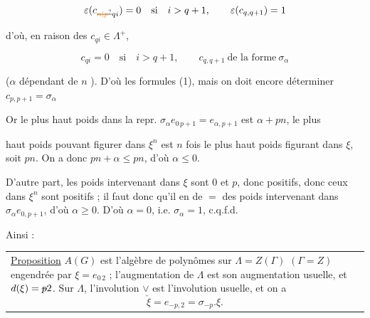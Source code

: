 \[ \varepsilon(c_{\deleted{\unsure{n|p}}qi})=0\quad\text{si}\quad i>q+1,\qquad \varepsilon(c_{q,q+1})=1 \]

d'où, en raison des $c_{qi}\in\Lambda^+$,

\[ c_{qi}=0\quad\text{si}\quad i>q+1,\qquad c_{q,q+1}\ \text{de la forme}\ \sigma_\alpha \]

($\alpha$ dépendant de $n$ ). D'où les formules (1), mais on doit encore déterminer \deleted{\unsure{$=$}}   $c_{p,p+1}=\sigma_\alpha$

Or le plus haut poids dans la repr. $\sigma_\alpha e_{0\,p+1}=e_{\alpha,p+1}$ est $\alpha+pn$,  le plus



haut poids pouvant figurer dans $\xi^n$ est $n$ fois le plus haut poids figurant dans $\xi$, soit $pn$. On a donc $pn+\alpha\leq pn$, d'où $\alpha\leq0$.

D'autre part, les poids intervenant dans $\xi$ sont $0$ et $p$, donc positifs, donc ceux dans $\xi^n$ sont positifs ; il faut donc qu'il \deleted{\unsure{$\alpha$}} en  de $=$ des poids intervenant dans $\sigma_\alpha e_{0,p+1}$, d'où $\alpha\geq0$. D'où $\alpha=0$, i.e. $\sigma_\alpha=1$, c.q.f.d.

Ainsi :

\noindent\begin{tabular}{@{}|p{.92\linewidth}@{}}\uline{Proposition} $A(G)$ est l'algèbre de polynômes sur $\Lambda=Z(\Gamma)$ $(\Gamma=Z)$ engendrée par $\xi=e_{0\,2}$ ; l'augmentation de $\Lambda$ est son augmentation usuelle, et $d(\xi)=\deleted{p}2$. Sur $\Lambda$, l'involution $\vee$ est l'involution usuelle, et on a
\[ \check\xi=e_{-p,2}=\sigma_{-p}.\xi. \]
\end{tabular}

